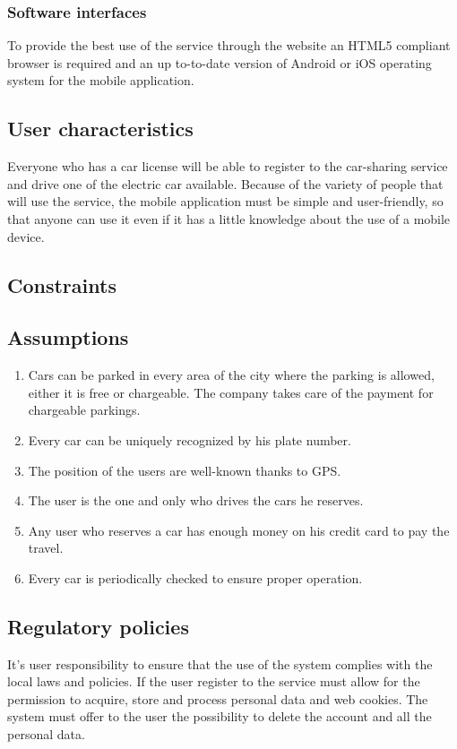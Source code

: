 \documentclass[english]{article}
\begin{document}
\subsubsection{Software interfaces}
To provide the best use of the service through the website an HTML5 compliant browser is required and an up to-to-date version of Android or iOS operating system for the mobile application.





\subsection{User characteristics}
Everyone who has a car license will be able to register to the car-sharing service and drive one of the electric car available.
Because of the variety of people that will use the service, the mobile application must be simple and user-friendly, so that anyone can use it even if it has a little knowledge about the use of a mobile device.

\subsection{Constraints}



\subsection{Assumptions}
\begin{enumerate}
	\item Cars can be parked in every area of the city where the parking is allowed, either it is free or chargeable. The company 		                    takes care of the payment for chargeable parkings. 
	\item Every car can be uniquely recognized by his plate number.
	\item The position of the users are well-known thanks to GPS.
	\item The user is the one and only who drives the cars he reserves.
	\item Any user who reserves a car has enough money on his credit card to pay the travel.
	\item Every car is periodically checked to ensure proper operation.
\end{enumerate}

\subsection{Regulatory policies}
It’s user responsibility to ensure that the use of the system complies with the local laws and policies. If the user register to the service must allow for the permission to acquire, store and process personal data and web cookies. The system must offer to the user the possibility to delete the account and all the personal data.
\end{document}
